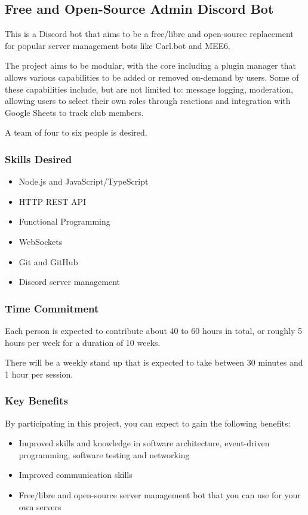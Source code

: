 \documentclass[../proposal-for-projects-2025.tex]{subfiles}
\begin{document}
\subsection{Free and Open-Source Admin Discord Bot}

This is a Discord bot that aims to be a free/libre and open-source replacement for popular server management bots like Carl.bot and MEE6.  

The project aims to be modular, with the core including a plugin manager that allows various capabilities to be added or removed on-demand by users. Some of these capabilities include, but are not limited to: message logging, moderation, allowing users to select their own roles through reactions and integration with Google Sheets to track club members.

A team of four to six people is desired.

\subsubsection*{Skills Desired}

\begin{multicols}{2}
\begin{itemize}
    \item Node.js and JavaScript/TypeScript
    \item HTTP REST API
    \item Functional Programming
    \item WebSockets
    \item Git and GitHub
    \item Discord server management
\end{itemize}
\end{multicols}

\subsubsection*{Time Commitment}

Each person is expected to contribute about 40 to 60 hours in total, or roughly 5 hours per week for a duration of 10 weeks.

There will be a weekly stand up that is expected to take between 30 minutes and 1 hour per session.

\subsubsection*{Key Benefits}

By participating in this project, you can expect to gain the following benefits:

\begin{itemize}
    \item Improved skills and knowledge in software architecture, event-driven programming, software testing and networking
    \item Improved communication skills
    \item Free/libre and open-source server management bot that you can use for your own servers
\end{itemize}
\end{document}
